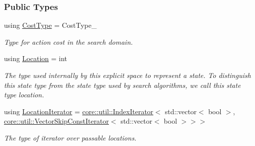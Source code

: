 \subsubsection*{Public Types}
\begin{DoxyCompactItemize}
\item 
using \hyperlink{structslb_1_1ext_1_1explicit__space_1_1Grid_a800819a8f2c96bf76dd9d36c18760815}{Cost\+Type} = Cost\+Type\+\_\+\hypertarget{structslb_1_1ext_1_1explicit__space_1_1Grid_a800819a8f2c96bf76dd9d36c18760815}{}\label{structslb_1_1ext_1_1explicit__space_1_1Grid_a800819a8f2c96bf76dd9d36c18760815}

\begin{DoxyCompactList}\small\item\em Type for action cost in the search domain. \end{DoxyCompactList}\item 
using \hyperlink{structslb_1_1ext_1_1explicit__space_1_1Grid_a2b2125f1774b299ea7f0f9f21d967fde}{Location} = int\hypertarget{structslb_1_1ext_1_1explicit__space_1_1Grid_a2b2125f1774b299ea7f0f9f21d967fde}{}\label{structslb_1_1ext_1_1explicit__space_1_1Grid_a2b2125f1774b299ea7f0f9f21d967fde}

\begin{DoxyCompactList}\small\item\em The type used internally by this explicit space to represent a state. To distinguish this state type from the state type used by search algorithms, we call this state type {\ttfamily location}. \end{DoxyCompactList}\item 
using \hyperlink{structslb_1_1ext_1_1explicit__space_1_1Grid_a75c71647e997ddb8f8f442d4e173d962}{Location\+Iterator} = \hyperlink{structslb_1_1core_1_1util_1_1IndexIterator}{core\+::util\+::\+Index\+Iterator}$<$ std\+::vector$<$ bool $>$, \hyperlink{structslb_1_1core_1_1util_1_1BasicVectorSkipIterator}{core\+::util\+::\+Vector\+Skip\+Const\+Iterator}$<$ std\+::vector$<$ bool $>$$>$$>$\hypertarget{structslb_1_1ext_1_1explicit__space_1_1Grid_a75c71647e997ddb8f8f442d4e173d962}{}\label{structslb_1_1ext_1_1explicit__space_1_1Grid_a75c71647e997ddb8f8f442d4e173d962}

\begin{DoxyCompactList}\small\item\em The type of iterator over passable locations. \end{DoxyCompactList}\end{DoxyCompactItemize}
